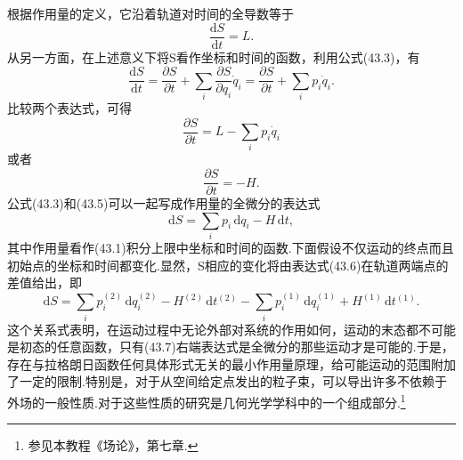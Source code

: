 根据作用量的定义，它沿着轨道对时间的全导数等于
\begin{equation}
  \frac{\mathrm{d}S}{\mathrm{d}t}=L.
\end{equation}
从另一方面，在上述意义下将S看作坐标和时间的函数，利用公式(43.3)，有
\begin{equation*}
  \frac{\mathrm{d}S}{\mathrm{d}t}
  =\frac{\partial S}{\partial t}
  +\sum_i\frac{\partial S}{\partial q_i}\dot{q}_i
  =\frac{\partial S}{\partial t}+\sum_i p_i\dot{q}_i.
\end{equation*}
比较两个表达式，可得
\begin{equation*}
  \frac{\partial S}{\partial t}=L-\sum_i p_i\dot{q}_i
\end{equation*}
或者
\begin{equation}
  \frac{\partial S}{\partial t}=-H.
\end{equation}
公式(43.3)和(43.5)可以一起写成作用量的全微分的表达式
\begin{equation}
  \mathrm{d}S=\sum_i p_i\,\mathrm{d}q_i-H\,\mathrm{d}t,
\end{equation}
其中作用量看作(43.1)积分上限中坐标和时间的函数.下面假设不仅运动的终点而且初始点的坐标和时间都变化.显然，S相应的变化将由表达式(43.6)在轨道两端点的差值给出，即
\begin{equation}
  \mathrm{d}S=\sum_i p_i^{(2)}\,\mathrm{d}q_i^{(2)}
  -H^{(2)}\,\mathrm{d}t^{(2)}
  -\sum_i p_i^{(1)}\,\mathrm{d}q_i^{(1)}
  +H^{(1)}\,\mathrm{d}t^{(1)}.
\end{equation}
这个关系式表明，在运动过程中无论外部对系统的作用如何，运动的末态都不可能是初态的任意函数，只有(43.7)右端表达式是全微分的那些运动才是可能的.于是，存在与拉格朗日函数任何具体形式无关的最小作用量原理，给可能运动的范围附加了一定的限制.特别是，对于从空间给定点发出的粒子束，可以导出许多不依赖于外场的一般性质.对于这些性质的研究是几何光学学科中的一个组成部分.\footnote{参见本教程《场论》，第七章.}

